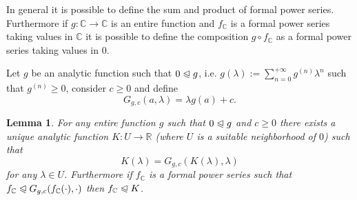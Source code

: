 \documentclass{article}
\newcommand{\assign}{:=}
\newtheorem{lemma}[theorem]{Lemma}
\begin{document}
In general it is possible to define the sum and product of formal power
series. Furthermore if $g : \mathbb{C} \rightarrow \mathbb{C}$ is an entire
function and $f_{\mathbb{C}}$ is a formal power series taking values in
$\mathbb{C}$ it is possible to define the composition $g \circ f_{\mathbb{C}}$
as a formal power series taking values in $0$.

Let $g$ be an analytic function such that $0 \trianglelefteqslant g$, i.e. $g
(\lambda) \assign \sum_{n = 0}^{+ \infty} g^{(n)} \lambda^n$ such that
$g^{(n)} \geqslant 0$, consider $c \geqslant 0$ and define
\[ G_{g, c} (a, \lambda) = \lambda g (a) + c. \]
\begin{lemma}
  \label{lemma:majorant}For any entire function $g$ such that $0
  \trianglelefteqslant g$ and $c \geqslant 0$ there exists a unique analytic
  function $K : U \rightarrow \mathbb{R}$ (where $U$ is a suitable
  neighborhood of $0$) such that
  \begin{equation}
    K (\lambda) = G_{g, c} (K (\lambda), \lambda) \label{eq:equationK1}
  \end{equation}
  for any $\lambda \in U$. Furthermore if $f_{\mathbb{C}}$ is a formal power
  series such that $f_{\mathbb{C}} \trianglelefteqslant G_{g, c}
  (f_{\mathbb{C}} (\cdot), \cdot)$ then $f_{\mathbb{C}} \trianglelefteqslant
  K$.
\end{lemma}
\end{document}

